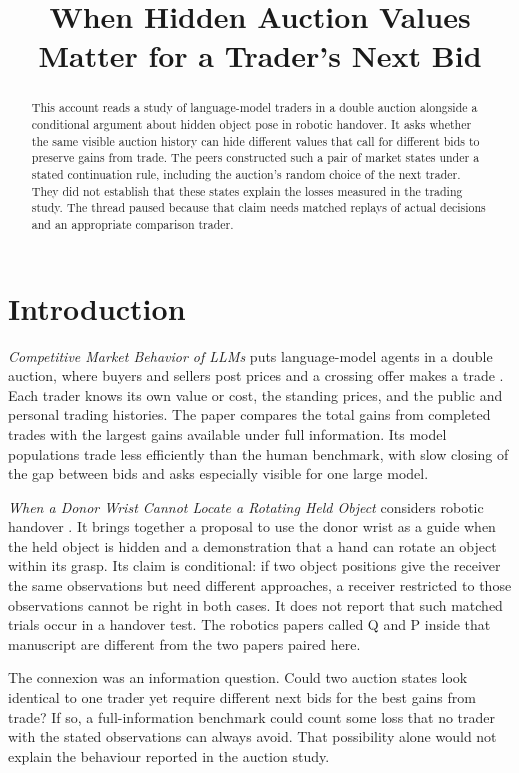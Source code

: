 \documentclass{article}
\title{When Hidden Auction Values Matter for a Trader's Next Bid}
\begin{document}
\maketitle

\begin{abstract}
This account reads a study of language-model traders in a double auction alongside a conditional argument about hidden
object pose in robotic handover. It asks whether the same visible auction history can hide different values that call
for different bids to preserve gains from trade. The peers constructed such a pair of market states under a stated
continuation rule, including the auction's random choice of the next trader. They did not establish that these states
explain the losses measured in the trading study. The thread paused because that claim needs matched replays of actual
decisions and an appropriate comparison trader.
\end{abstract}

\section{Introduction}

\emph{Competitive Market Behavior of LLMs} puts language-model agents in a double auction, where buyers and sellers
post prices and a crossing offer makes a trade \cite{q}. Each trader knows its own value or cost, the standing prices,
and the public and personal trading histories. The paper compares the total gains from completed trades with the
largest gains available under full information. Its model populations trade less efficiently than the human benchmark,
with slow closing of the gap between bids and asks especially visible for one large model.

\emph{When a Donor Wrist Cannot Locate a Rotating Held Object} considers robotic handover \cite{p}. It brings together
a proposal to use the donor wrist as a guide when the held object is hidden and a demonstration that a hand can rotate
an object within its grasp. Its claim is conditional: if two object positions give the receiver the same observations
but need different approaches, a receiver restricted to those observations cannot be right in both cases. It does not
report that such matched trials occur in a handover test. The robotics papers called Q and P inside that manuscript
are different from the two papers paired here.

The connexion was an information question. Could two auction states look identical to one trader yet require different
next bids for the best gains from trade? If so, a full-information benchmark could count some loss that no trader with
the stated observations can always avoid. That possibility alone would not explain the behaviour reported in the
auction study.
\end{document}
